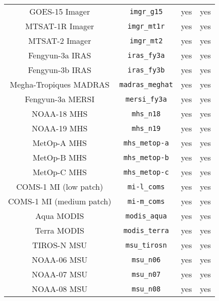 \begin{center}
\begin{longtable}{c c c c}
  GOES-15 Imager                     & \texttt{imgr\_g15}           &  yes     &  yes       \\
  MTSAT-1R Imager                    & \texttt{imgr\_mt1r}          &  yes     &  yes       \\
  MTSAT-2 Imager                     & \texttt{imgr\_mt2}           &  yes     &  yes       \\
  Fengyun-3a IRAS                    & \texttt{iras\_fy3a}          &  yes     &  yes       \\
  Fengyun-3b IRAS                    & \texttt{iras\_fy3b}          &  yes     &  yes       \\
  Megha-Tropiques MADRAS             & \texttt{madras\_meghat}      &  yes     &  yes       \\
  Fengyun-3a MERSI                   & \texttt{mersi\_fy3a}         &  yes     &  yes       \\
  NOAA-18 MHS                        & \texttt{mhs\_n18}            &  yes     &  yes       \\
  NOAA-19 MHS                        & \texttt{mhs\_n19}            &  yes     &  yes       \\
  MetOp-A MHS                        & \texttt{mhs\_metop-a}        &  yes     &  yes       \\
  MetOp-B MHS                        & \texttt{mhs\_metop-b}        &  yes     &  yes       \\
  MetOp-C MHS                        & \texttt{mhs\_metop-c}        &  yes     &  yes       \\
  COMS-1 MI (low patch)              & \texttt{mi-l\_coms}          &  yes     &  yes       \\
  COMS-1 MI (medium patch)           & \texttt{mi-m\_coms}          &  yes     &  yes       \\
  Aqua MODIS                         & \texttt{modis\_aqua}         &  yes     &  yes       \\
  Terra MODIS                        & \texttt{modis\_terra}        &  yes     &  yes       \\
  TIROS-N MSU                        & \texttt{msu\_tirosn}         &  yes     &  yes       \\
  NOAA-06 MSU                        & \texttt{msu\_n06}            &  yes     &  yes       \\
  NOAA-07 MSU                        & \texttt{msu\_n07}            &  yes     &  yes       \\
  NOAA-08 MSU                        & \texttt{msu\_n08}            &  yes     &  yes       \\

\end{longtable}
\end{center}
